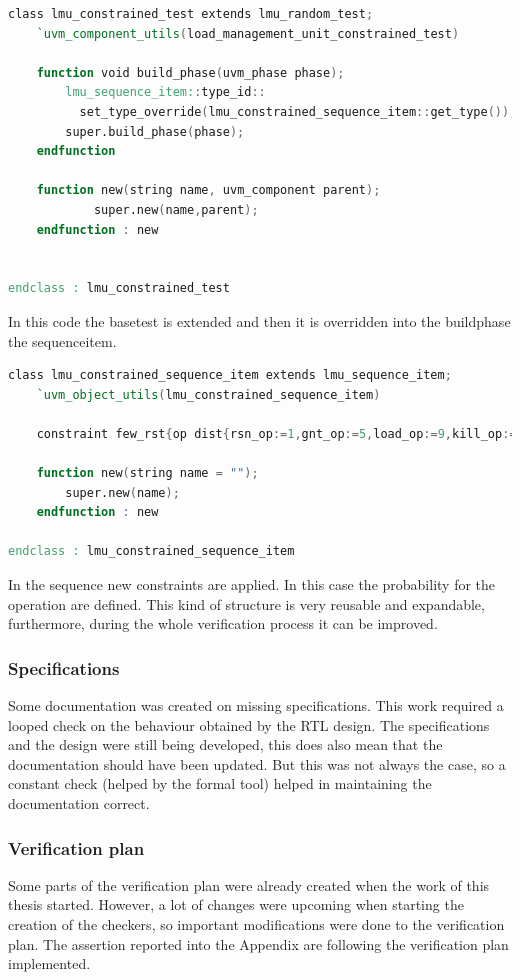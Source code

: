 \linespread{1}
\begin{lstlisting}[language=Verilog,style=verilog-style, backgroundcolor=\color{lyel_palette}, frame=tlb]
class lmu_constrained_test extends lmu_random_test;
    `uvm_component_utils(load_management_unit_constrained_test)

	function void build_phase(uvm_phase phase);
		lmu_sequence_item::type_id::
		  set_type_override(lmu_constrained_sequence_item::get_type());
		super.build_phase(phase);
	endfunction

	function new(string name, uvm_component parent);
      		super.new(name,parent);
   	endfunction : new


endclass : lmu_constrained_test
\end{lstlisting}
\linespread{1.2}
In this code the base\+test is extended and then it is overridden into the build\+phase the sequence\+item.


\linespread{1}
\begin{lstlisting}[language=Verilog,style=verilog-style, backgroundcolor=\color{lyel_palette}, frame=tlb]
class lmu_constrained_sequence_item extends lmu_sequence_item;
	`uvm_object_utils(lmu_constrained_sequence_item)

	constraint few_rst{op dist{rsn_op:=1,gnt_op:=5,load_op:=9,kill_op:=2};}
	
	function new(string name = "");
		super.new(name);
	endfunction : new

endclass : lmu_constrained_sequence_item
\end{lstlisting}
\linespread{1.2}
In the sequence new constraints are applied. In this case the probability for the operation are defined.
This kind of structure is very reusable and expandable, furthermore, during the whole verification process it can be improved.

\subsubsection{Specifications}
Some documentation was created on missing specifications.
This work required a looped check on the behaviour obtained by the RTL design. The specifications and the design were still being developed, this does also mean that the documentation should have been updated. But this was not always the case, so a constant check (helped by the formal tool) helped in maintaining the documentation correct.

\subsubsection{Verification plan}
Some parts of the verification plan were already created when the work of this thesis started. However, a lot of changes were upcoming when starting the creation of the checkers, so important modifications were done to the verification plan.
The assertion reported into the Appendix are following the verification plan implemented.

